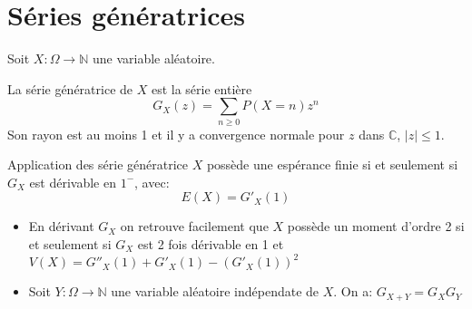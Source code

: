 \documentclass[french, a4paper, 10pt, twocolumn]{article}
\newcommand{\N}{\mathbb{N}}   %
\newcommand{\C}{\mathbb{C}}   %
\begin{document}
\section{Séries génératrices}

\begin{definition}
  Soit \(X: \Omega \rightarrow \N\) une variable aléatoire.

  La série génératrice de \(X\) est la série entière
  \[G_X(z)=\sum_{n\geqslant 0}P(X=n)z^n\]
  Son rayon est au moins 1 et il y a convergence normale pour \(z\) dans \(\C\), \(\lvert z \rvert \leqslant 1\).
\end{definition}

\begin{theoreme}{Application des série génératrice}
  \(X\) possède une espérance finie si et seulement si \(G_X\) est dérivable en \(1^-\), avec:
  \[E(X)=G'_X(1)\]
  \tcblower
  \begin{itemize}
    \item En dérivant \(G_X\) on retrouve facilement que \(X\) possède un moment d'ordre 2 si et seulement si \(G_X\) est
      2 fois dérivable en 1 et \(V(X)=G''_X(1)+G'_X(1)-(G'_X(1))^2\)
    \item Soit \(Y: \Omega \rightarrow \N\) une variable aléatoire indépendate de \(X\). On a: \(G_{X+Y}=G_X G_Y\)
  \end{itemize}
\end{theoreme}
\end{document}
